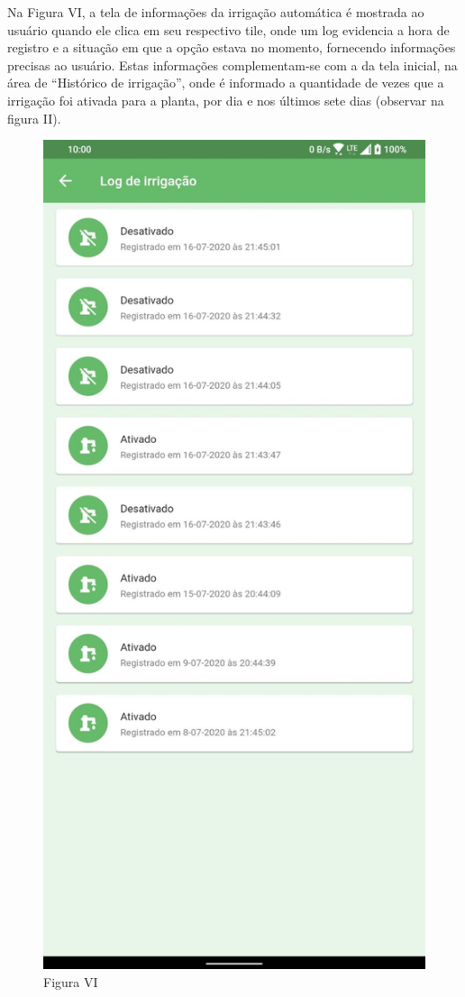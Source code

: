 \documentclass[eso]{bcc}
\begin{document}
Na Figura VI, a tela de informações da irrigação automática é mostrada ao usuário quando ele clica 
em seu respectivo tile, onde um log evidencia a hora de registro e a situação em que a opção estava 
no momento, fornecendo informações precisas ao usuário. Estas informações complementam-se com a da 
tela inicial, na área de “Histórico de irrigação”, onde é informado a quantidade de vezes que a 
irrigação foi ativada para a planta, por dia e nos últimos sete dias (observar na figura II).

\begin{figure}[htbp]
\centerline{\includegraphics[scale=.25]{Figuras/figura-vi.jpg}}
\caption{Figura VI}\label{fig-vi}
\end{figure}
\end{document}
